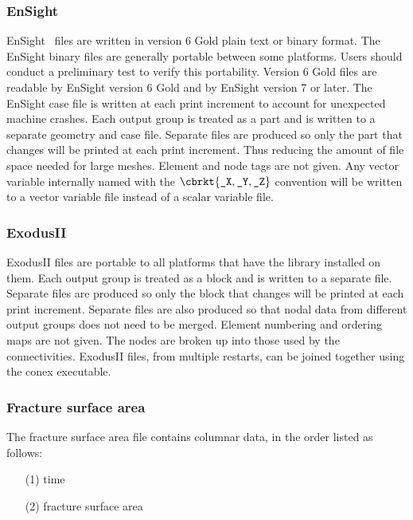 \subsubsection{\textsf{EnSight}}
\textsf{EnSight}~\cite{EnSight6} 
files are written in version 6 Gold plain text or binary format. 
The \textsf{EnSight} binary files are generally portable between some platforms. 
Users should conduct a preliminary test to verify this portability. 
Version 6 Gold files are readable by \textsf{EnSight} 
version 6 Gold and by \textsf{EnSight}
version 7 or later.  The \textsf{EnSight} case file is written at each print
increment to account for unexpected machine crashes.  Each output group is
treated as a part and is written to a separate geometry and case file. 
Separate files are produced so only the part that changes will be printed
at each print increment.  Thus reducing the amount of file space needed for
large meshes.  Element and node tags are not given.  Any vector variable
internally named with the
$\cbrkt{\texttt{\_{X}}, \texttt{\_{Y}}, \texttt{\_{Z}}}$
convention will be written to a
vector variable file instead of a scalar variable file.

\subsubsection{\textsf{ExodusII}}
\textsf{ExodusII} files are portable to all platforms that have the library
installed on them.  Each output group is treated as a block and is written
to a separate file.  Separate files are produced so only the block that
changes will be printed at each print increment.  Separate files are also
produced so that nodal data from different output groups does not need to
be merged.  Element numbering and ordering maps are not given.  The nodes
are broken up into those used by the connectivities.  
\textsf{ExodusII} files, from
multiple restarts, can be joined together using the conex executable.

\subsubsection{Fracture surface area}
The fracture surface area file contains columnar data, in the order listed
as follows: 
\begin{itemize}
\item[(1)] time
\item[(2)] fracture surface area
\end{itemize}

